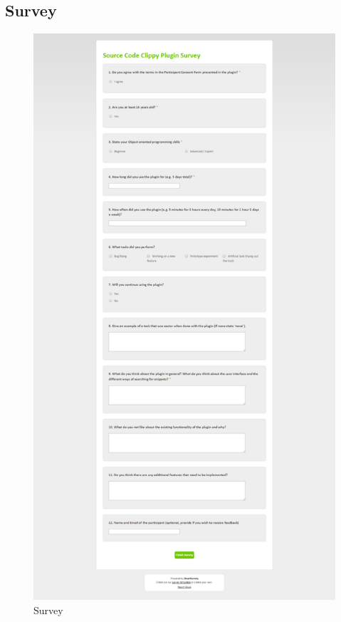 \documentclass{l4proj}
\begin{document}
\begin{appendices}
\section{Survey}
\begin{figure}[H]
\centering
\includegraphics[scale=0.25]{appendices/survey.png}
\caption{Survey}
\label{appendix:survey}
\end{figure}


\end{appendices}
\end{document}
